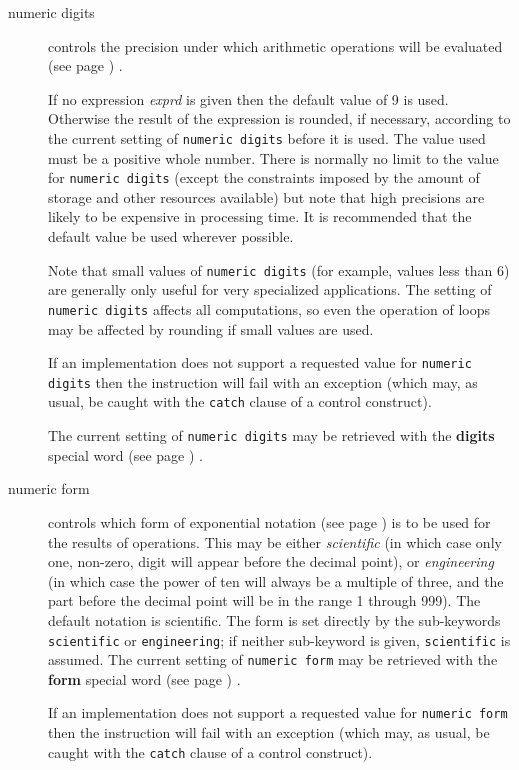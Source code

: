 \begin{description}
\item[numeric digits]\label{refndigits}

controls the precision under which arithmetic operations will be
 evaluated (see page \pageref{refndi2}) .

If no expression \emph{exprd} is given then the default value of 9
is used.
Otherwise the result of the expression is rounded, if necessary,
according to the current setting of \texttt{numeric digits} before it is
used.
The value used must be a positive whole number.
 There is normally no limit to the value for \texttt{numeric digits}
(except the constraints imposed by the amount of storage and other
resources available) but note that high precisions are likely to be
expensive in processing time.
It is recommended that the default value be used wherever possible.
 
Note that small values of \texttt{numeric digits} (for example, values
less than 6) are generally only useful for very specialized applications.
The setting of \texttt{numeric digits} affects all computations, so even
the operation of loops may be affected by rounding if small values are
used.
 
If an implementation does not support a requested value for \texttt{numeric
digits} then the instruction will fail with an exception (which may,
as usual, be caught with the \texttt{catch} clause of a control
construct).
 
The current setting of \texttt{numeric digits} may be retrieved with the
 \textbf{digits} special word (see page \pageref{refswdigit}) .
\item[numeric form]\label{refnform}

controls which form of  exponential notation (see page \pageref{refnfo2})  is to
be used for the results of operations.
This may be either \emph{scientific} (in which case only one,
non-zero, digit will appear before the decimal point), or
\emph{engineering} (in which case the power of ten will always be a
multiple of three, and the part before the decimal point will be in the
range 1 through 999).
The default notation is scientific.
 The form is set directly by the sub-keywords \texttt{scientific} or
\texttt{engineering}; if neither sub-keyword is given,
\texttt{scientific} is assumed.
The current setting of \texttt{numeric form} may be retrieved with the
 \textbf{form} special word (see page \pageref{refswform}) .
 
If an implementation does not support a requested value for \texttt{numeric
form} then the instruction will fail with an exception (which may,
as usual, be caught with the \texttt{catch} clause of a control
construct).
\end{description}
 

